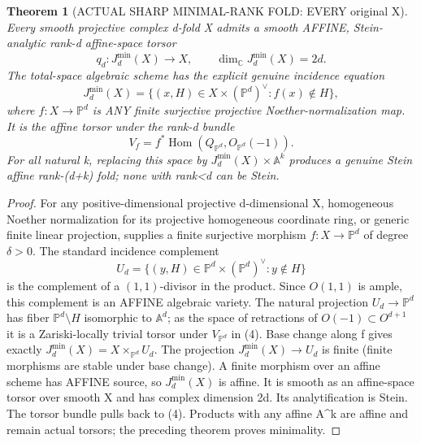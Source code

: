 \documentclass[11pt]{article}
\newtheorem{theorem}{Theorem}
\begin{document}
\begin{theorem}[ACTUAL SHARP MINIMAL-RANK FOLD: EVERY original X]
Every smooth projective complex d-fold X
admits a smooth AFFINE, Stein-analytic
rank-d affine-space torsor
\[
 \boxed{
 q_d:J_d^{\min}(X)\to X,\qquad
 \dim_\mathbb C J_d^{\min}(X)=2d.
 }                                                       \tag{2}
\]
The total-space algebraic scheme has
the explicit genuine incidence equation
\[
 \boxed{
 J_d^{\min}(X)=
 \{(x,H)\in X\times(\mathbb P^d)^\vee:
                    f(x)\notin H\},
 }                                                       \tag{3}
\]
where $f:X\to\mathbb P^d$ is ANY finite
surjective projective Noether-normalization map.
It is the affine torsor under the
rank-d bundle
\[
 \boxed{
 V_f=f^*\operatorname{Hom}
       (Q_{\mathbb P^d},O_{\mathbb P^d}(-1)).
 }                                                       \tag{4}
\]
For all natural k, replacing this space
by $J_d^{\min}(X)\times\mathbb A^k$
produces a genuine Stein affine
rank-(d+k) fold; none with rank<d
can be Stein.
\end{theorem}
\begin{proof}
For any positive-dimensional projective
d-dimensional X, homogeneous
Noether normalization for its
projective homogeneous coordinate
ring, or generic finite linear
projection, supplies a finite
surjective morphism
$f:X\to\mathbb P^d$ of degree
$\delta>0$. The standard incidence
complement
\[
 U_d=\{(y,H)\in\mathbb P^d\times
 (\mathbb P^d)^\vee:y\notin H\}
\]
is the complement of a
$(1,1)$-divisor in the product.
Since $O(1,1)$ is ample,
this complement is an AFFINE
algebraic variety.
The natural projection $U_d\to\mathbb P^d$
has fiber $\mathbb P^d\setminus H$
isomorphic to $\mathbb A^d$;
as the space of retractions of
$O(-1)\subset O^{d+1}$ it is
a Zariski-locally trivial torsor
under $V_{\mathbb P^d}$ in (4).
Base change along f gives exactly
$J_d^{\min}(X)=X\times_{\mathbb P^d}U_d$.
The projection $J_d^{\min}(X)\to U_d$
is finite (finite morphisms are
stable under base change).
A finite morphism over an affine
scheme has AFFINE source, so
$J_d^{\min}(X)$ is affine.
It is smooth as an affine-space
torsor over smooth X and has
complex dimension 2d.
Its analytification is Stein.
The torsor bundle pulls back
to (4).
Products with any affine A^k
are affine and remain actual
torsors; the preceding theorem
proves minimality.
\end{proof}
\end{document}
